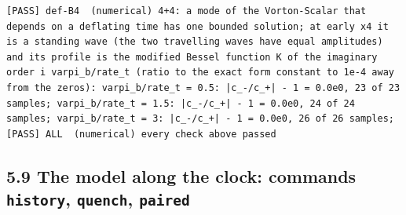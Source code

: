 \documentclass[
  10pt,
]{article}
\begin{document}
\begin{verbatim}
[PASS] def-B4  (numerical) 4+4: a mode of the Vorton-Scalar that depends on a deflating time has one bounded solution; at early x4 it is a standing wave (the two travelling waves have equal amplitudes) and its profile is the modified Bessel function K of the imaginary order i varpi_b/rate_t (ratio to the exact form constant to 1e-4 away from the zeros): varpi_b/rate_t = 0.5: |c_-/c_+| - 1 = 0.0e0, 23 of 23 samples; varpi_b/rate_t = 1.5: |c_-/c_+| - 1 = 0.0e0, 24 of 24 samples; varpi_b/rate_t = 3: |c_-/c_+| - 1 = 0.0e0, 26 of 26 samples;
[PASS] ALL  (numerical) every check above passed
\end{verbatim}

\hypertarget{the-model-along-the-clock-commands-history-quench-paired}{%
\subsection{\texorpdfstring{5.9 The model along the clock: commands
\texttt{history}, \texttt{quench},
\texttt{paired}}{5.9 The model along the clock: commands history, quench, paired}}\label{the-model-along-the-clock-commands-history-quench-paired}}
\end{document}
